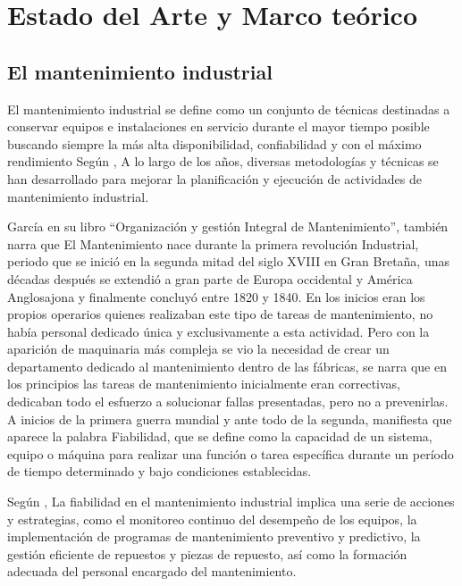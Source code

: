 \documentclass[
  11pt,
  bookmarksnumbered]{article}
\begin{document}
\newpage

\hypertarget{estado-del-arte-y-marco-teuxf3rico}{%
\section{Estado del Arte y Marco teórico}\label{estado-del-arte-y-marco-teuxf3rico}}

\hypertarget{el-mantenimiento-industrial}{%
\subsection{El mantenimiento industrial}\label{el-mantenimiento-industrial}}

El mantenimiento industrial se define como un conjunto de técnicas destinadas a conservar equipos e instalaciones en servicio durante el mayor tiempo posible buscando siempre la más alta disponibilidad, confiabilidad y con el máximo rendimiento Según \textcite{Garcia2010}, A lo largo de los años, diversas metodologías y técnicas se han desarrollado para mejorar la planificación y ejecución de actividades de mantenimiento industrial.

García en su libro ``Organización y gestión Integral de Mantenimiento'', también narra que El Mantenimiento nace durante la primera revolución Industrial, periodo que se inició en la segunda mitad del siglo XVIII en Gran Bretaña, unas décadas después se extendió a gran parte de Europa occidental y América Anglosajona y finalmente concluyó entre 1820 y 1840.
En los inicios eran los propios operarios quienes realizaban este tipo de tareas de mantenimiento, no había personal dedicado única y exclusivamente a esta actividad.
Pero con la aparición de maquinaria más compleja se vio la necesidad de crear un departamento dedicado al mantenimiento dentro de las fábricas, se narra que en los principios las tareas de mantenimiento inicialmente eran correctivas, dedicaban todo el esfuerzo a solucionar fallas presentadas, pero no a prevenirlas.
A inicios de la primera guerra mundial y ante todo de la segunda, \textcite{Garcia2010} manifiesta que aparece la palabra Fiabilidad, que se define como la capacidad de un sistema, equipo o máquina para realizar una función o tarea específica durante un período de tiempo determinado y bajo condiciones establecidas.

Según \textcite{Smith2018}, La fiabilidad en el mantenimiento industrial implica una serie de acciones y estrategias, como el monitoreo continuo del desempeño de los equipos, la implementación de programas de mantenimiento preventivo y predictivo, la gestión eficiente de repuestos y piezas de repuesto, así como la formación adecuada del personal encargado del mantenimiento.
\end{document}

